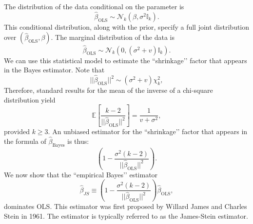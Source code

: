 \documentclass[11pt]{article} %
\begin{document}
The distribution of the data conditional on the parameter is 
\[ \widehat{\beta}_{\textrm{OLS}} \sim \mathcal{N}_{k}(\beta, \sigma^2 \mathbb{I}_k).  \]
This conditional distribution, along with the prior, specify a full joint distribution over $(\widehat{\beta}_{\textrm{OLS}}, \beta)$. The marginal distribution of the data is 
\[\widehat{\beta}_{\textrm{OLS}} \sim \mathcal{N}_{k}\left ( 0 , (\sigma^2  + v)  \mathbb{I}_k  \right). \]
We can use this statistical model to estimate the ``shrinkage’’ factor that appears in the Bayes estimator. Note that
\[ ||\widehat{\beta}_{\textrm{OLS}} ||^2 \sim (\sigma^2 + v) \chi^2_{k}, \]
Therefore, standard results for the mean of the inverse of a chi-square distribution yield
\[\mathbb{E} \left[ \frac{k-2 }{||\widehat{\beta}_{\textrm{OLS}} ||^2} \right] = \frac{1}{v+\sigma^2}, \]
provided $k \geq 3$. An unbiased estimator for the ``shrinkage’’ factor that appears in the formula of $\widehat{\beta}_{\textrm{Bayes}}$ is thus:
\[\left(1 -  \frac{\sigma^2 (k-2)}{||\widehat{\beta}_{\textrm{OLS}} ||^2} \right). \]
We now show that the ``empirical Bayes’’ estimator 
\[\widehat{\beta}_{JS} \equiv \left(1 -  \frac{\sigma^2 (k-2)}{||\widehat{\beta}_{\textrm{OLS}} ||^2} \right) \widehat{\beta}_{\textrm{OLS}}, \]
dominates OLS. This estimator was first proposed by Willard James and Charles Stein in 1961. The estimator is typically referred to as the James-Stein estimator. 
\end{document}
